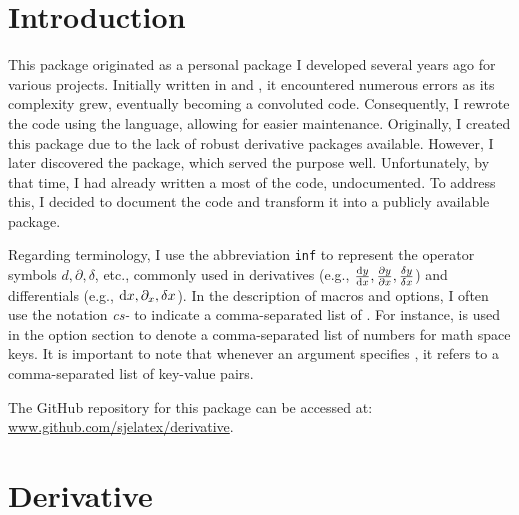 	\clearpage
	\section{Introduction}
This package originated as a personal package I developed several years ago for various projects. Initially written in \tex{} and \latex{}, it encountered numerous errors as its complexity grew, eventually becoming a convoluted code. Consequently, I rewrote the code using the  language, allowing for easier maintenance. Originally, I created this package due to the lack of robust derivative packages available. However, I later discovered the  package, which served the purpose well. Unfortunately, by that time, I had already written a most of the code, undocumented. To address this, I decided to document the code and transform it into a publicly available package.

\bigskip

Regarding terminology, I use the abbreviation \texttt{inf} to represent the operator symbols $d, \partial, \delta$, etc., commonly used in derivatives (e.g., $\odv{y}{x}, \pdv{y}{x}, \fdv{y}{x}$) and differentials (e.g., $\odif{x}, \pdif{x}, \fdif{x}$). In the description of macros and options, I often use the notation \emph{cs-} to indicate a comma-separated list of . For instance,  is used in the option section to denote a comma-separated list of numbers for math space keys. It is important to note that whenever an argument specifies , it refers to a comma-separated list of key-value pairs.

\bigskip

\noindent The GitHub repository for this package can be accessed at:\\ \href{https://github.com/sjelatex/derivative}{www.github.com/sjelatex/derivative}.


	
	\clearpage
	\section{Derivative}\label{sec:derivative}

